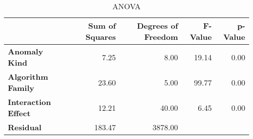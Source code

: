 \begin{table}
\centering
\caption{ANOVA}
\label{tab:h1_anova}
\begin{tabular}{lrrrr}
\toprule
 & Sum of Squares & Degrees of Freedom & F-Value & p-Value \\
\midrule
\textbf{Anomaly Kind} & 7.25 & 8.00 & 19.14 & 0.00 \\
\textbf{Algorithm Family} & 23.60 & 5.00 & 99.77 & 0.00 \\
\textbf{Interaction Effect} & 12.21 & 40.00 & 6.45 & 0.00 \\
\textbf{Residual} & 183.47 & 3878.00 &  &  \\
\bottomrule
\end{tabular}
\end{table}
